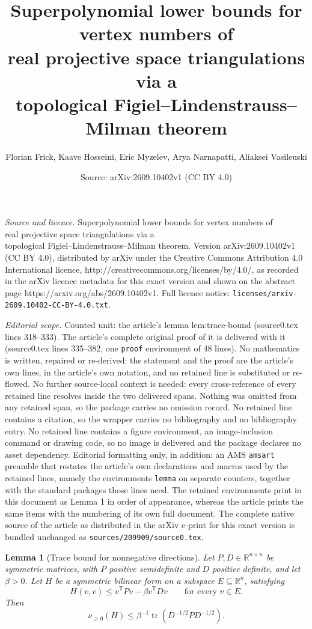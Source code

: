 \documentclass[10pt,a4paper]{amsart}
\title{Superpolynomial lower bounds for vertex numbers of\\ real projective space triangulations via a\\ topological Figiel--Lindenstrauss--Milman theorem}
\author{Florian Frick, Kaave Hosseini, Eric Myzelev, Arya Narnapatti, Aliaksei Vasileuski}
\date{Source: arXiv:2609.10402v1 (CC BY 4.0)}
\newtheorem{lemma}{Lemma}
\begin{document}
\maketitle

\noindent\emph{Source and licence.} Superpolynomial lower bounds for vertex numbers of\\ real projective space triangulations via a\\ topological Figiel--Lindenstrauss--Milman theorem. Version arXiv:2609.10402v1 (CC BY 4.0), distributed by arXiv under the Creative Commons Attribution 4.0 International licence, http://creativecommons.org/licenses/by/4.0/, as recorded in the arXiv licence metadata for this exact version and shown on the abstract page https://arxiv.org/abs/2609.10402v1. Full licence notice: \texttt{licenses/arxiv-2609.10402-CC-BY-4.0.txt}.\par\smallskip

\noindent\textit{Editorial scope.} Counted unit: the article's lemma lem:trace-bound (source0.tex lines 318--333). The article's complete original proof of it is delivered with it (source0.tex lines 335--382, one \texttt{proof} environment of 48 lines). No mathematics is written, repaired or re-derived: the statement and the proof are the article's own lines, in the article's own notation, and no retained line is substituted or re-flowed.  No further source-local context is needed: every cross-reference of every retained line resolves inside the two delivered spans.  Nothing was omitted from any retained span, so the package carries no omission record.  No retained line contains a citation, so the wrapper carries no bibliography and no bibliography entry.  No retained line contains a figure environment, an image-inclusion command or drawing code, so no image is delivered and the package declares no asset dependency.  Editorial formatting only, in addition: an AMS \texttt{amsart} preamble that restates the article's own declarations and macros used by the retained lines, namely the environments \texttt{lemma} on separate counters, together with the standard packages those lines need.  The retained environments print in this document as Lemma 1 in order of appearance, whereas the article prints the same items with the numbering of its own full document.  The complete native source of the article as distributed in the arXiv e-print for this exact version is bundled unchanged as \texttt{sources/209909/source0.tex}.
\begin{lemma}[Trace bound for nonnegative directions]
\label{lem:trace-bound}
Let $P,D\in\mathbb R^{n\times n}$ be symmetric matrices, with $P$
positive semidefinite and $D$ positive definite, and let $\beta>0$.
Let $H$ be a symmetric bilinear form on a subspace
$E\subseteq\mathbb R^n$, satisfying
\[
 H(v,v)\leq v^{\mathsf T}Pv-\beta v^{\mathsf T}Dv
 \qquad\text{for every }v\in E.
\]
Then
\begin{equation}\label{eq:tracelemma}
 \nu_{\geq0}(H)
 \leq \beta^{-1}\operatorname{tr}(D^{-1/2}PD^{-1/2}).
\end{equation}
\end{lemma}
\end{document}
